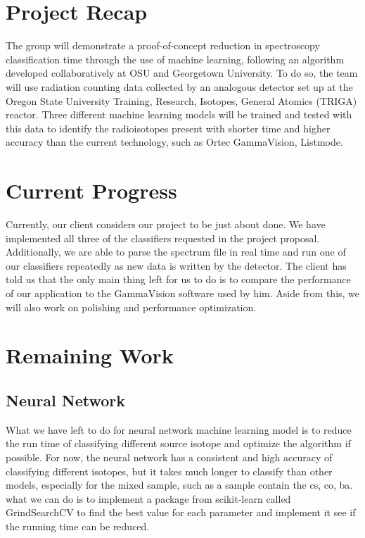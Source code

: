 \documentclass[onecolumn, draftclsnofoot,10pt, compsoc]{IEEEtran}
\begin{document}
\section{Project Recap}
The group will demonstrate a proof-of-concept reduction in spectroscopy classification time through the use of machine learning, following an algorithm developed collaboratively at OSU and Georgetown University.
To do so, the team will use radiation counting data collected by an analogous detector set up at the Oregon State University Training, Research, Isotopes, General Atomics (TRIGA) reactor.
Three different machine learning models will be trained and tested with this data to identify the radioisotopes present with shorter time and higher accuracy than the current technology, such as Ortec GammaVision, Listmode.

\section{Current Progress}
Currently, our client considers our project to be just about done.
We have implemented all three of the classifiers requested in the project proposal.
Additionally, we are able to parse the spectrum file in real time and run one of our classifiers repeatedly as new data is written by the detector.
The client has told us that the only main thing left for us to do is to compare the performance of our application to the GammaVision software used by him.
Aside from this, we will also work on polishing and performance optimization.

\section{Remaining Work}

\subsection{Neural Network}
What we have left to do for neural network machine learning model is to reduce the run time of classifying different source isotope and optimize the algorithm if possible. For now, the neural network has a consistent and high accuracy of classifying different isotopes, but it takes much longer to classify than other models, especially for the mixed sample, such as a sample contain the cs, co, ba. what we can do is to implement a package from scikit-learn called GrindSearchCV to find the best value for each parameter and implement it see if the running time can be reduced. 
\end{document}
